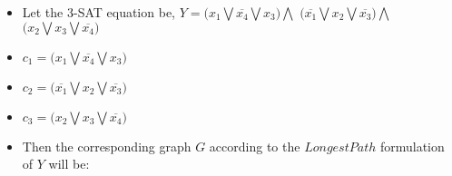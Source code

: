 \begin{itemize} 
    \item<1->Let the 3-SAT equation be,
        $Y = \bigl({x_1} \bigvee \overline{x_4} \bigvee {x_3}\bigr) \bigwedge$ \newline $\bigl(\overline{x_1} \bigvee{x_2} \bigvee \overline{x_3}\bigr) \bigwedge$ \newline
        $\bigl({x_2} \bigvee {x_3} \bigvee \overline{x_4}\bigr)$
    \item<2->[-] $c_1 = \bigl({x_1} \bigvee \overline{x_4} \bigvee {x_3}\bigr)$
    \item<2->[-] $c_2 = \bigl(\overline{x_1} \bigvee{x_2} \bigvee \overline{x_3}\bigr)$
    \item<2->[-] $c_3 = \bigl({x_2} \bigvee {x_3} \bigvee \overline{x_4}\bigr)$
    \item<3->Then the corresponding graph $G$ according to the $Longest Path$ formulation of $Y$ will be:
        
\end{itemize}